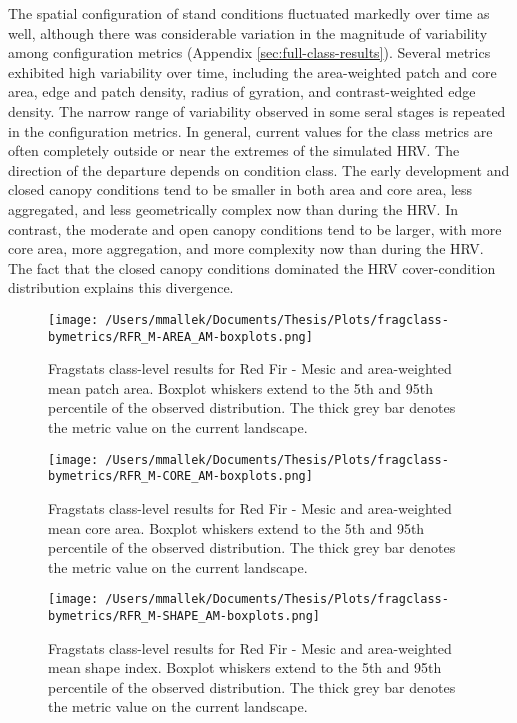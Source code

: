 The spatial configuration of stand conditions fluctuated markedly over time as well, although there was considerable variation in the magnitude of variability among configuration metrics (Appendix \ref{sec:full-class-results}). Several metrics exhibited high variability over time, including the area-weighted patch and core area, edge and patch density, radius of gyration, and contrast-weighted edge density. The narrow range of variability observed in some seral stages is repeated in the configuration metrics. In general, current values for the class metrics are often completely outside or near the extremes of the simulated HRV. The direction of the departure depends on condition class. The early development and closed canopy conditions tend to be smaller in both area and core area, less aggregated, and less geometrically complex now than during the HRV. In contrast, the moderate and open canopy conditions tend to be larger, with more core area, more aggregation, and more complexity now than during the HRV. The fact that the closed canopy conditions dominated the HRV cover-condition distribution explains this divergence.

\begin{figure}[!htbp]
\centering
    \texttt{[image: /Users/mmallek/Documents/Thesis/Plots/fragclass-bymetrics/RFR\_M-AREA\_AM-boxplots.png]}
  \caption{Fragstats class-level results for Red Fir - Mesic and area-weighted mean patch area. Boxplot whiskers extend to the 5th and 95th percentile of the observed distribution. The thick grey bar denotes the metric value on the current landscape.}
  \label{fig:rfrm_areaam}
\end{figure}


\begin{figure}[!htbp]
\centering
    \texttt{[image: /Users/mmallek/Documents/Thesis/Plots/fragclass-bymetrics/RFR\_M-CORE\_AM-boxplots.png]}
  \caption{Fragstats class-level results for Red Fir - Mesic and area-weighted mean core area. Boxplot whiskers extend to the 5th and 95th percentile of the observed distribution. The thick grey bar denotes the metric value on the current landscape.}
  \label{fig:rfrm_coream}
\end{figure}


\begin{figure}[!htbp]
\centering
    \texttt{[image: /Users/mmallek/Documents/Thesis/Plots/fragclass-bymetrics/RFR\_M-SHAPE\_AM-boxplots.png]}
  \caption{Fragstats class-level results for Red Fir - Mesic and area-weighted mean shape index. Boxplot whiskers extend to the 5th and 95th percentile of the observed distribution. The thick grey bar denotes the metric value on the current landscape.}
  \label{fig:rfrm_shapeam}
\end{figure}


